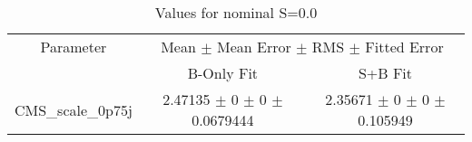 \begin{table}
\centering
\caption{Values for nominal S=0.0}
\begin{tabular}{ccc}
\toprule
Parameter & \multicolumn{2}{c}{Mean $\pm$ Mean Error $\pm$ RMS $\pm$ Fitted Error}\\
 & B-Only Fit & S+B Fit\\
\midrule
CMS\_scale\_0p75j & \num{2.47135} $\pm$ \num{0} $\pm$ \num{0} $\pm$ \num{0.0679444} & \num{2.35671} $\pm$ \num{0} $\pm$ \num{0} $\pm$ \num{0.105949}\\
\bottomrule
\end{tabular}
\end{table}